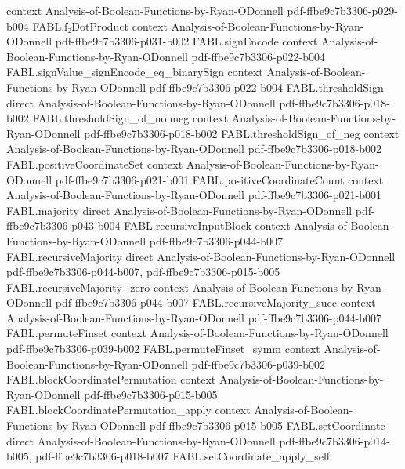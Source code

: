 \begin{theorem}
  {context}
  {Analysis-of-Boolean-Functions-by-Ryan-ODonnell}
  {pdf-ffbe9c7b3306-p029-b004}
\proofstep
  {FABL.f₂DotProduct}
  {context}
  {Analysis-of-Boolean-Functions-by-Ryan-ODonnell}
  {pdf-ffbe9c7b3306-p031-b002}
\proofstep
  {FABL.signEncode}
  {context}
  {Analysis-of-Boolean-Functions-by-Ryan-ODonnell}
  {pdf-ffbe9c7b3306-p022-b004}
\proofstep
  {FABL.signValue_signEncode_eq_binarySign}
  {context}
  {Analysis-of-Boolean-Functions-by-Ryan-ODonnell}
  {pdf-ffbe9c7b3306-p022-b004}
\proofstep
  {FABL.thresholdSign}
  {direct}
  {Analysis-of-Boolean-Functions-by-Ryan-ODonnell}
  {pdf-ffbe9c7b3306-p018-b002}
\proofstep
  {FABL.thresholdSign_of_nonneg}
  {context}
  {Analysis-of-Boolean-Functions-by-Ryan-ODonnell}
  {pdf-ffbe9c7b3306-p018-b002}
\proofstep
  {FABL.thresholdSign_of_neg}
  {context}
  {Analysis-of-Boolean-Functions-by-Ryan-ODonnell}
  {pdf-ffbe9c7b3306-p018-b002}
\proofstep
  {FABL.positiveCoordinateSet}
  {context}
  {Analysis-of-Boolean-Functions-by-Ryan-ODonnell}
  {pdf-ffbe9c7b3306-p021-b001}
\proofstep
  {FABL.positiveCoordinateCount}
  {context}
  {Analysis-of-Boolean-Functions-by-Ryan-ODonnell}
  {pdf-ffbe9c7b3306-p021-b001}
\proofstep
  {FABL.majority}
  {direct}
  {Analysis-of-Boolean-Functions-by-Ryan-ODonnell}
  {pdf-ffbe9c7b3306-p043-b004}
\proofstep
  {FABL.recursiveInputBlock}
  {context}
  {Analysis-of-Boolean-Functions-by-Ryan-ODonnell}
  {pdf-ffbe9c7b3306-p044-b007}
\proofstep
  {FABL.recursiveMajority}
  {direct}
  {Analysis-of-Boolean-Functions-by-Ryan-ODonnell}
  {pdf-ffbe9c7b3306-p044-b007,
    pdf-ffbe9c7b3306-p015-b005}
\proofstep
  {FABL.recursiveMajority_zero}
  {context}
  {Analysis-of-Boolean-Functions-by-Ryan-ODonnell}
  {pdf-ffbe9c7b3306-p044-b007}
\proofstep
  {FABL.recursiveMajority_succ}
  {context}
  {Analysis-of-Boolean-Functions-by-Ryan-ODonnell}
  {pdf-ffbe9c7b3306-p044-b007}
\proofstep
  {FABL.permuteFinset}
  {context}
  {Analysis-of-Boolean-Functions-by-Ryan-ODonnell}
  {pdf-ffbe9c7b3306-p039-b002}
\proofstep
  {FABL.permuteFinset_symm}
  {context}
  {Analysis-of-Boolean-Functions-by-Ryan-ODonnell}
  {pdf-ffbe9c7b3306-p039-b002}
\proofstep
  {FABL.blockCoordinatePermutation}
  {context}
  {Analysis-of-Boolean-Functions-by-Ryan-ODonnell}
  {pdf-ffbe9c7b3306-p015-b005}
\proofstep
  {FABL.blockCoordinatePermutation_apply}
  {context}
  {Analysis-of-Boolean-Functions-by-Ryan-ODonnell}
  {pdf-ffbe9c7b3306-p015-b005}
\proofstep
  {FABL.setCoordinate}
  {direct}
  {Analysis-of-Boolean-Functions-by-Ryan-ODonnell}
  {pdf-ffbe9c7b3306-p014-b005,
    pdf-ffbe9c7b3306-p018-b007}
\proofstep
  {FABL.setCoordinate_apply_self}

\end{theorem}
